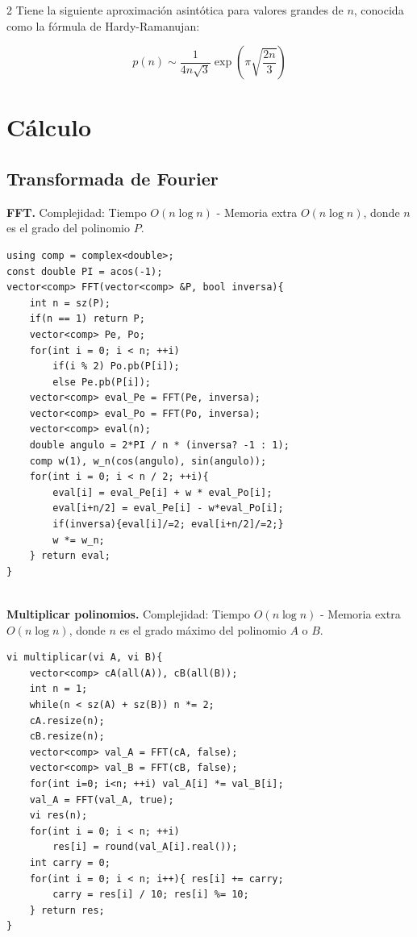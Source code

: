 \documentclass[10pt,spanish,mexico]{article}
\numberwithin{equation}{section}
\begin{document}
\begin{multicols}{2}
Tiene la siguiente aproximación asintótica para valores grandes de $n$, conocida como la fórmula de Hardy-Ramanujan:

\[
p(n) \sim \frac{1}{4n\sqrt{3}} \exp\left( \pi \sqrt{\frac{2n}{3}} \right)
\]


\hrulefill
\section{Cálculo}
\subsection{Transformada de Fourier}
\textbf{FFT.} Complejidad: Tiempo $O(n\log n)$ - Memoria extra $O(n\log n)$, donde $n$ es el grado del polinomio $P$.
\begin{verbatim}
using comp = complex<double>;
const double PI = acos(-1);
vector<comp> FFT(vector<comp> &P, bool inversa){
    int n = sz(P);
    if(n == 1) return P;
    vector<comp> Pe, Po;
    for(int i = 0; i < n; ++i)
        if(i % 2) Po.pb(P[i]);
        else Pe.pb(P[i]);
    vector<comp> eval_Pe = FFT(Pe, inversa);
    vector<comp> eval_Po = FFT(Po, inversa);
    vector<comp> eval(n);
    double angulo = 2*PI / n * (inversa? -1 : 1);
    comp w(1), w_n(cos(angulo), sin(angulo));
    for(int i = 0; i < n / 2; ++i){
        eval[i] = eval_Pe[i] + w * eval_Po[i];
        eval[i+n/2] = eval_Pe[i] - w*eval_Po[i];
        if(inversa){eval[i]/=2; eval[i+n/2]/=2;}
        w *= w_n;
    } return eval;
}
\end{verbatim}

\vspace{-1.2\baselineskip}
\hrulefill\\
\textbf{Multiplicar polinomios.} Complejidad: Tiempo $O(n\log n)$ - Memoria extra $O(n\log n)$, donde $n$ es el grado máximo del polinomio $A$ o $B$.
\begin{verbatim}
vi multiplicar(vi A, vi B){
    vector<comp> cA(all(A)), cB(all(B));
    int n = 1;
    while(n < sz(A) + sz(B)) n *= 2;
    cA.resize(n);
    cB.resize(n);
    vector<comp> val_A = FFT(cA, false);
    vector<comp> val_B = FFT(cB, false);
    for(int i=0; i<n; ++i) val_A[i] *= val_B[i];
    val_A = FFT(val_A, true);
    vi res(n);
    for(int i = 0; i < n; ++i)
        res[i] = round(val_A[i].real());
    int carry = 0;
    for(int i = 0; i < n; i++){ res[i] += carry;
        carry = res[i] / 10; res[i] %= 10;
    } return res;
}
\end{verbatim}


\vspace{-1.2\baselineskip}
\hrulefill

\end{multicols}
\end{document}
